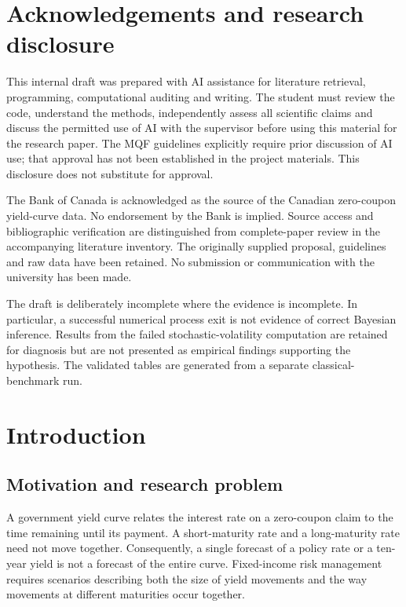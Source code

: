 \documentclass[
  12pt,
  letterpaper,
  DIV=11,
  numbers=noendperiod]{scrreprt}
\begin{document}
\clearpage
\chapter*{Acknowledgements and research disclosure}

This internal draft was prepared with AI assistance for literature
retrieval, programming, computational auditing and writing. The student
must review the code, understand the methods, independently assess all
scientific claims and discuss the permitted use of AI with the
supervisor before using this material for the research paper. The MQF
guidelines explicitly require prior discussion of AI use; that approval
has not been established in the project materials. This disclosure does
not substitute for approval.

The Bank of Canada is acknowledged as the source of the Canadian
zero-coupon yield-curve data. No endorsement by the Bank is implied.
Source access and bibliographic verification are distinguished from
complete-paper review in the accompanying literature inventory. The
originally supplied proposal, guidelines and raw data have been
retained. No submission or communication with the university has been
made.

The draft is deliberately incomplete where the evidence is incomplete.
In particular, a successful numerical process exit is not evidence of
correct Bayesian inference. Results from the failed
stochastic-volatility computation are retained for diagnosis but are not
presented as empirical findings supporting the hypothesis. The validated
tables are generated from a separate classical-benchmark run.

\clearpage
\tableofcontents
\clearpage
\listoftables
\clearpage
\listoffigures
\clearpage
{}

\chapter{Introduction}\label{sec-introduction}

\section{Motivation and research
problem}\label{motivation-and-research-problem}

A government yield curve relates the interest rate on a zero-coupon
claim to the time remaining until its payment. A short-maturity rate and
a long-maturity rate need not move together. Consequently, a single
forecast of a policy rate or a ten-year yield is not a forecast of the
entire curve. Fixed-income risk management requires scenarios describing
both the size of yield movements and the way movements at different
maturities occur together.
\end{document}
